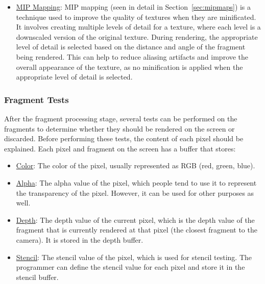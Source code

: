 \begin{itemize}
    \item \ul{MIP Mapping}: MIP mapping (seen in detail in Section~\ref{sec:mipmaps}) is a technique used to improve the quality of textures when they are minificated. It involves creating multiple levels of detail for a texture, where each level is a downscaled version of the original texture. During rendering, the appropriate level of detail is selected based on the distance and angle of the fragment being rendered. This can help to reduce aliasing artifacts and improve the overall appearance of the texture, as no minification is applied when the appropriate level of detail is selected.
\end{itemize}


\subsubsection{Fragment Tests}

After the fragment processing stage, several tests can be performed on the fragments to determine whether they should be rendered on the screen or discarded. Before performing these tests, the content of each pixel should be explained. Each pixel and fragment on the screen has a buffer that stores:
\begin{itemize}
    \item \ul{Color}: The color of the pixel, usually represented as RGB (red, green, blue).
    \item \ul{Alpha}: The alpha value of the pixel, which people tend to use it to represent the transparency of the pixel. However, it can be used for other purposes as well.
    \item \ul{Depth}: The depth value of the current pixel, which is the depth value of the fragment that is currently rendered at that pixel (the closest fragment to the camera). It is stored in the depth buffer.
    \item \ul{Stencil}: The stencil value of the pixel, which is used for stencil testing. The programmer can define the stencil value for each pixel and store it in the stencil buffer.
\end{itemize}


